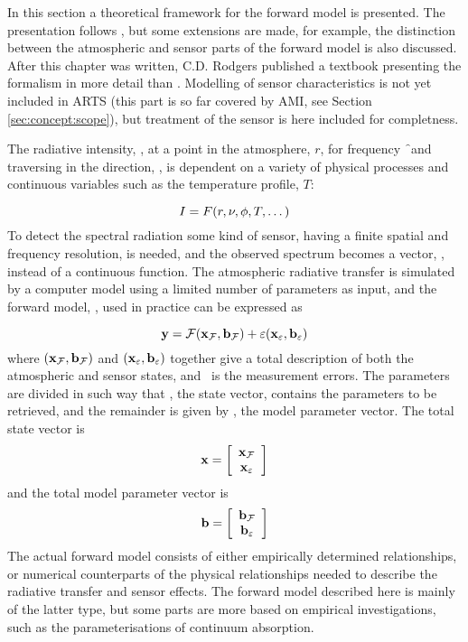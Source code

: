 %
%
In this section a theoretical framework for the forward model is
presented. The presentation follows \citet{rodgers:90}, but some
extensions are made, for example, the distinction between the
atmospheric and sensor parts of the forward model is also discussed.
After this chapter was written, C.D. Rodgers published a textbook
\citep{rodgers:00} presenting the formalism in more detail than
\citet{rodgers:90}. Modelling of sensor characteristics is not yet
included in ARTS (this part is so far covered by AMI, see Section
\ref{sec:concept:scope}), but treatment of the sensor is here included
for completness.



 \label{sec:formalism:fm}
 
 The radiative intensity, \mpbi, at a point in the atmosphere, $r$, for
 frequency \f\ and traversing in the direction, \view, is dependent
 on a variety of physical processes and continuous variables such as
 the temperature profile, $T$:

 \begin{equation}
   I = F(r,\nu,\phi,T,\dots)
 \end{equation} 
 To detect the spectral radiation some kind of sensor, having a finite
 spatial and frequency resolution, is needed, and the observed
 spectrum becomes a vector, \y, instead of a continuous function.
 The atmospheric radiative transfer is simulated by a computer model
 using a limited number of parameters as input, and the forward model,
 \fm, used in practice can be expressed as
 
 \begin{equation}
   \mathbf{y} = \mathcal{F}(\mathbf{x}_{\mathcal{F}},\mathbf{b}_{\mathcal{F}}) + \varepsilon(\mathbf{x}_{\varepsilon},\mathbf{b}_{\varepsilon})
  \label{eq:formalism:fm}
 \end{equation}
 where $(\mathbf{x}_{\mathcal{F}},\mathbf{b}_{\mathcal{F}})$ and $(\mathbf{x}_{\varepsilon},\mathbf{b}_{\varepsilon})$ together give a
 total description of both the atmospheric and sensor states, and
 \merr\ is the measurement errors. The parameters are divided in such
 way that \xt, the state vector, contains the parameters to be
 retrieved, and the remainder is given by \bt, the model parameter
 vector. The total state vector is
 \begin{equation}
   \mathbf{x} = \left[ \begin{array}{c} \mathbf{x}_{\mathcal{F}} \\ \mathbf{x}_{\varepsilon} \end{array} \right]
 \end{equation}
 and the total model parameter vector is
 \begin{equation}
   \mathbf{b} = \left[ \begin{array}{c} \mathbf{b}_{\mathcal{F}} \\ \mathbf{b}_{\varepsilon} \end{array} \right]
 \end{equation}
 The actual forward model consists of either empirically determined
 relationships, or numerical counterparts of the physical
 relationships needed to describe the radiative transfer and sensor
 effects. The forward model described here is mainly of the latter
 type, but some parts are more based on empirical investigations, such
 as the parameterisations of continuum absorption. 
  
